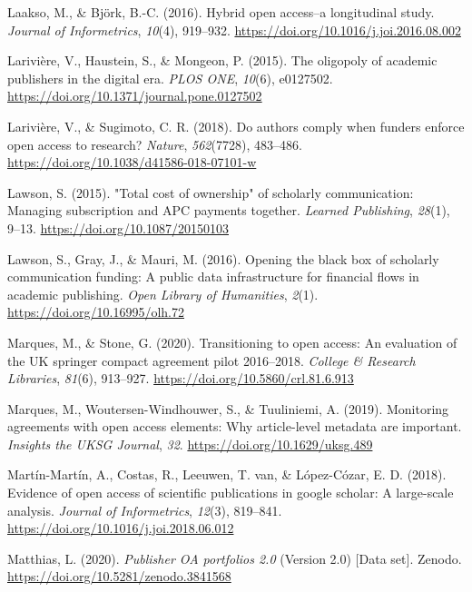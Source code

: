 \documentclass[a4paper,man,floatsintext,longtable,noextraspace,12pt]{apa6}
\newenvironment{CSLReferences}%
  {}%
  {\par}
\begin{document}
\begin{CSLReferences}{1}{0}
\leavevmode\hypertarget{ref-Laakso_2016}{}%
Laakso, M., \& Björk, B.-C. (2016). Hybrid open access--a longitudinal
study. \emph{Journal of Informetrics}, \emph{10}(4), 919--932.
\url{https://doi.org/10.1016/j.joi.2016.08.002}

\leavevmode\hypertarget{ref-Larivi_re_2015}{}%
Larivière, V., Haustein, S., \& Mongeon, P. (2015). The oligopoly of
academic publishers in the digital era. \emph{{PLOS} {ONE}},
\emph{10}(6), e0127502.
\url{https://doi.org/10.1371/journal.pone.0127502}

\leavevmode\hypertarget{ref-Larivi_re_2018}{}%
Larivière, V., \& Sugimoto, C. R. (2018). Do authors comply when funders
enforce open access to research? \emph{Nature}, \emph{562}(7728),
483--486. \url{https://doi.org/10.1038/d41586-018-07101-w}

\leavevmode\hypertarget{ref-Lawson_2015}{}%
Lawson, S. (2015). "Total cost of ownership" of scholarly communication:
Managing subscription and {APC} payments together. \emph{Learned
Publishing}, \emph{28}(1), 9--13. \url{https://doi.org/10.1087/20150103}

\leavevmode\hypertarget{ref-Lawson_2016}{}%
Lawson, S., Gray, J., \& Mauri, M. (2016). Opening the black box of
scholarly communication funding: A public data infrastructure for
financial flows in academic publishing. \emph{Open Library of
Humanities}, \emph{2}(1). \url{https://doi.org/10.16995/olh.72}

\leavevmode\hypertarget{ref-Marques_2020}{}%
Marques, M., \& Stone, G. (2020). Transitioning to open access: An
evaluation of the {UK} springer compact agreement pilot 2016--2018.
\emph{College {\&} Research Libraries}, \emph{81}(6), 913--927.
\url{https://doi.org/10.5860/crl.81.6.913}

\leavevmode\hypertarget{ref-Marques_2019}{}%
Marques, M., Woutersen-Windhouwer, S., \& Tuuliniemi, A. (2019).
Monitoring agreements with open access elements: Why article-level
metadata are important. \emph{Insights the {UKSG} Journal}, \emph{32}.
\url{https://doi.org/10.1629/uksg.489}

\leavevmode\hypertarget{ref-Mart_n_Mart_n_2018}{}%
Martín-Martín, A., Costas, R., Leeuwen, T. van, \& López-Cózar, E. D.
(2018). Evidence of open access of scientific publications in google
scholar: A large-scale analysis. \emph{Journal of Informetrics},
\emph{12}(3), 819--841. \url{https://doi.org/10.1016/j.joi.2018.06.012}

\leavevmode\hypertarget{ref-Matthias_2020}{}%
Matthias, L. (2020). \emph{Publisher OA portfolios 2.0} (Version 2.0)
{[}Data set{]}. Zenodo. \url{https://doi.org/10.5281/zenodo.3841568}


\end{CSLReferences}
\end{document}
